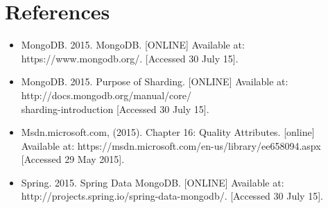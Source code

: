 \section{References}
\begin{itemize}
	\item MongoDB. 2015. MongoDB. [ONLINE] Available at: https://www.mongodb.org/. [Accessed 30 July 15].

	\item MongoDB. 2015. Purpose of Sharding. [ONLINE] 
	Available at: http://docs.mongodb.org/manual/core/ \\sharding-introduction [Accessed 30 July 15].

	\item Msdn.microsoft.com, (2015). Chapter 16: Quality Attributes. [online]
	 Available at: https://msdn.microsoft.com/en-us/library/ee658094.aspx [Accessed 29 May 2015].

	\item Spring. 2015. Spring Data MongoDB. [ONLINE] Available at: http://projects.spring.io/spring-data-mongodb/. [Accessed 30 July 15].
\end{itemize}